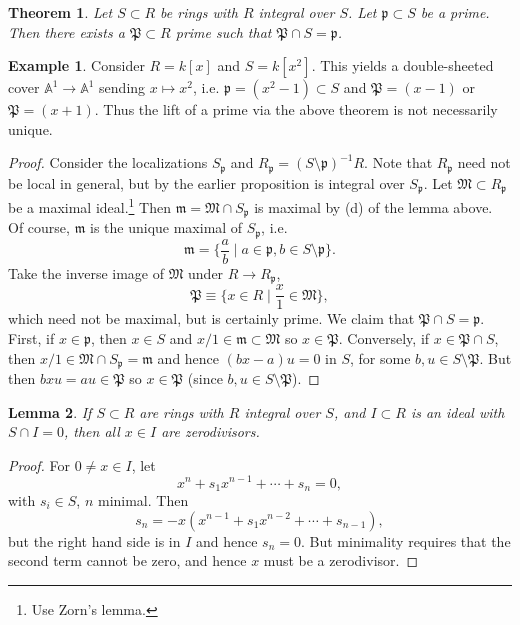 \documentclass{article}
\newcommand{\fr}{\mathfrak}
\newcommand{\A}{\mathbb{A}}
\theoremstyle{plain}
\newtheorem{thm}{Theorem}
\newtheorem{lem}[thm]{Lemma}
\theoremstyle{definition}
\newtheorem{exmp}{Example}
\theoremstyle{remark}
\begin{document}
\begin{thm}
    Let $S\subset R$ be rings with $R$ integral over $S$. Let $\fr p\subset S$ be a prime.
    Then there exists a $\fr P\subset R$ prime such that $\fr P\cap S=\fr p$.
\end{thm} 

\begin{exmp}
    Consider $R=k[x]$ and $S=k[x^2]$. This yields a double-sheeted cover $\A^1\to\A^1$ sending $x\mapsto x^2$,
    i.e. $\fr p=(x^2-1)\subset S$ and $\fr P=(x-1)$ or $\fr P=(x+1)$. Thus the lift of a prime
    via the above theorem is not necessarily unique.
\end{exmp}

\begin{proof}
    Consider the localizations $S_{\fr p}$ and $R_{\fr p}=(S\setminus\fr p)^{-1}R$.
    Note that $R_{\fr p}$ need not be local in general, but by the earlier proposition
    is integral over $S_{\fr p}$. Let $\fr M\subset R_{\fr p}$ be a maximal ideal.\footnote{Use Zorn's lemma.}
    Then $\fr m=\fr M\cap S_{\fr p}$ is maximal by (d) of the lemma above. Of course, $\fr m$
    is the unique maximal of $S_{\fr p}$, i.e.
    \[\fr m=\{\frac{a}{b}\mid a\in\fr p,b\in S\setminus\fr p\}.\]
    Take the inverse image of $\fr M$ under $R\to R_{\fr p}$,
    \[\fr P\equiv\{x\in R\mid \frac{x}{1}\in\fr M\},\]
    which need not be maximal, but is certainly prime. We claim that $\fr P\cap S=\fr p$.
    First, if $x\in\fr p$, then $x\in S$ and $x/1\in\fr m\subset\fr M$ so $x\in\fr P$.
    Conversely, if $x\in \fr P\cap S$, then $x/1\in\fr M\cap S_{\fr p}=\fr m$ and hence
    $(bx-a)u=0$ in $S$, for some $b,u\in S\setminus\fr P$. But then $bxu=au\in\fr P$ so
    $x\in\fr P$ (since $b,u\in S\setminus\fr P$).
\end{proof}

\begin{lem}
    If $S\subset R$ are rings with $R$ integral over $S$, and $I\subset R$ is an ideal
    with $S\cap I=0$, then all $x\in I$ are zerodivisors.
\end{lem}
\begin{proof}
    For $0\neq x\in I$, let
    \[x^n+s_1x^{n-1}+\cdots + s_n=0,\]
    with $s_i\in S$, $n$ minimal. Then
    \[s_n=-x(x^{n-1}+s_1x^{n-2}+\cdots+s_{n-1}),\]
    but the right hand side is in $I$ and hence $s_n=0$. But minimality requires that
    the second term cannot be zero, and hence $x$ must be a zerodivisor.
\end{proof}
\end{document}
